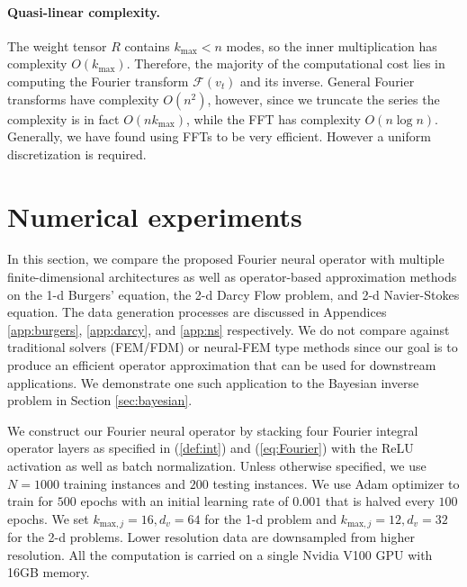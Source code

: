 \documentclass{article} %
\newcommand{\cG}{\mathcal{F}}
\begin{document}

\paragraph{Quasi-linear complexity.}
The weight tensor $R$ contains $k_{\text{max}} < n$ modes, so the inner multiplication has complexity $O(k_{\text{max}})$. Therefore, the majority of the computational cost lies in computing the Fourier transform $\cG(v_t)$ and its inverse. General Fourier transforms have complexity $O(n^2)$, however, since we truncate the series the complexity is in fact $O(n k_{\text{max}})$, while the FFT has complexity $O(n \log n)$. Generally, we have found using FFTs to be very efficient. However a uniform discretization is required. 


\section{Numerical experiments}
\label{sec:numerics}
In this section, we compare the proposed Fourier neural operator with multiple finite-dimensional architectures as well as operator-based approximation methods on the 1-d Burgers' equation, the 2-d Darcy Flow problem, and 2-d Navier-Stokes equation. The data generation processes are discussed in Appendices \ref{app:burgers},  \ref{app:darcy}, and \ref{app:ns} respectively. We do not compare against traditional solvers (FEM/FDM) or neural-FEM type methods since our goal is to produce an efficient operator approximation that can be used for downstream applications. We demonstrate one such application to the Bayesian inverse problem in Section \ref{sec:bayesian}.

We construct our Fourier neural operator by stacking four Fourier integral operator layers as specified in (\ref{def:int}) and (\ref{eq:Fourier}) with the ReLU activation as well as batch normalization. Unless otherwise specified, we use $N=1000$ training instances and $200$ testing instances. We use Adam optimizer to train for $500$ epochs with an initial learning rate of $0.001$ that is halved every $100$ epochs. We set $k_{\text{max},j} = 16, d_v=64$ for the 1-d problem and $k_{\text{max},j} = 12, d_v=32$ for the 2-d problems. 
Lower resolution data are downsampled from higher resolution. 
All the computation is carried on a single Nvidia V100 GPU with 16GB memory.
\end{document}
